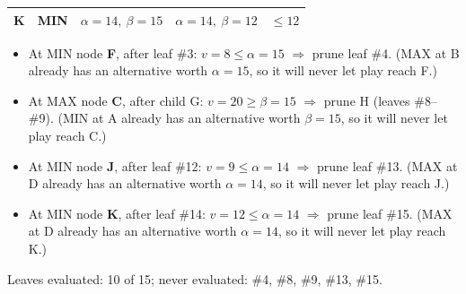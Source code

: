 \documentclass[11pt,a4paper]{article}
\begin{document}
\begin{solbox}
\begin{center}
\begin{tabular}{c c c c c}
K & MIN & $\alpha=14,\ \beta=15$ & $\alpha=14,\ \beta=12$ & $\le 12$ \\\bottomrule\end{tabular}\end{center}\begin{itemize}[leftmargin=1.5em,itemsep=1pt]
\item At MIN node \textbf{F}, after leaf \#3: $v=8 \le \alpha=15$ $\Rightarrow$ prune leaf \#4. (MAX at B already has an alternative worth $\alpha=15$, so it will never let play reach F.)
\item At MAX node \textbf{C}, after child G: $v=20 \ge \beta=15$ $\Rightarrow$ prune H (leaves \#8--\#9). (MIN at A already has an alternative worth $\beta=15$, so it will never let play reach C.)
\item At MIN node \textbf{J}, after leaf \#12: $v=9 \le \alpha=14$ $\Rightarrow$ prune leaf \#13. (MAX at D already has an alternative worth $\alpha=14$, so it will never let play reach J.)
\item At MIN node \textbf{K}, after leaf \#14: $v=12 \le \alpha=14$ $\Rightarrow$ prune leaf \#15. (MAX at D already has an alternative worth $\alpha=14$, so it will never let play reach K.)
\end{itemize}Leaves evaluated: 10 of 15; never evaluated: \#4, \#8, \#9, \#13, \#15.
\end{solbox}
\end{document}

